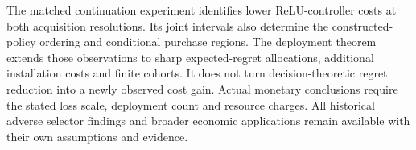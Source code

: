 \documentclass[ecta,nameyear,draft]{econsocart}
\begin{document}
The matched continuation experiment identifies lower ReLU-controller costs at both acquisition resolutions. Its joint intervals also determine the constructed-policy ordering and conditional purchase regions. The deployment theorem extends those observations to sharp expected-regret allocations, additional installation costs and finite cohorts. It does not turn decision-theoretic regret reduction into a newly observed cost gain. Actual monetary conclusions require the stated loss scale, deployment count and resource charges. All historical adverse selector findings and broader economic applications remain available with their own assumptions and evidence.



\end{document}

